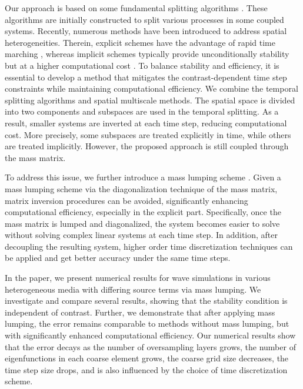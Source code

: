 \documentclass[preprint,12pt]{elsarticle}
\begin{document}
Our approach is based on some fundamental splitting algorithms \cite{chung2022contrast,chung2021contrast,hundsdorfer2013numerical,marchuk1990splitting}. These algorithms are initially constructed to split various processes in some coupled systems. Recently, numerous methods have been introduced to address spatial heterogeneities. Therein, explicit schemes have the advantage of rapid time marching \cite{virieux1984sh,gyrya2019explicit}, whereas implicit schemes typically provide unconditionally stability but at a higher computational cost \cite{alexander1977diagonally,burrage1979stability}.
To balance stability and efficiency, it is essential to develop a method that mitigates the contrast-dependent time step constraints while maintaining computational efficiency.
We combine the temporal splitting algorithms and spatial multiscale methods. The spatial space is divided into two components and subspaces are used in the temporal splitting. As a result, smaller systems are inverted at each time step, reducing computational cost. More precisely, some subspaces are treated explicitly in time, while others are treated implicitly. However, the proposed approach is still coupled through the mass matrix.

To address this issue, we further introduce a mass lumping scheme \cite{boscarino2013implicit,hu2025uniform,hinton1976note}. 
Given a mass lumping scheme via the diagonalization technique of the mass matrix, matrix inversion procedures can be avoided, significantly enhancing computational efficiency, especially in the explicit part. Specifically, once the mass matrix is lumped and diagonalized, the system becomes easier to solve without solving complex linear systems at each time step. In addition, after decoupling the resulting system, higher order time discretization techniques can be applied and get better accuracy under the same time steps.  


In the paper, we present numerical results for wave simulations in various heterogeneous media with differing source terms via mass lumping. We investigate and compare several results, showing that the stability condition is independent of contrast. Further, we demonstrate that after applying mass lumping, the error remains comparable to methods without mass lumping, but with significantly enhanced computational efficiency. Our numerical results show that the error decays as the number of oversampling layers grows, the number of eigenfunctions in each coarse element grows, the coarse grid size decreases, the time step size drops, and is also influenced by the choice of time discretization scheme.
\end{document}
